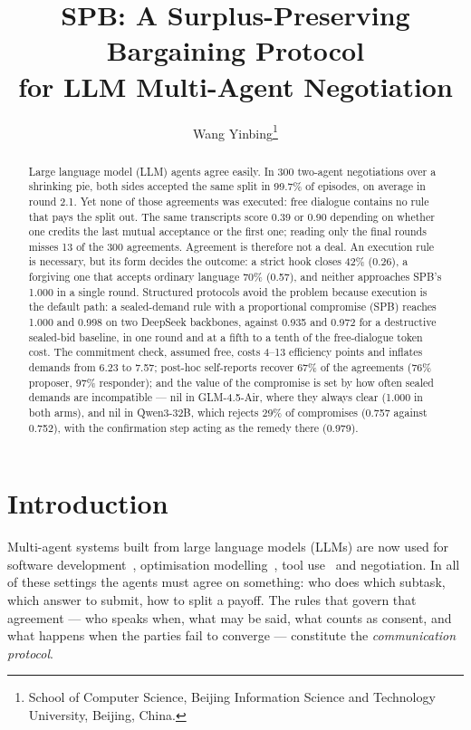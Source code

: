 \documentclass[11pt]{article}
\title{\textbf{SPB: A Surplus-Preserving Bargaining Protocol\\ for LLM Multi-Agent Negotiation}}
\author{Wang Yinbing\thanks{School of Computer Science, Beijing Information Science and Technology University, Beijing, China.}}
\date{}
\begin{document}
\maketitle

\begin{abstract}
\noindent Large language model (LLM) agents agree easily. In 300 two-agent negotiations over a shrinking pie, both sides accepted the same split in 99.7\% of episodes, on average in round 2.1. Yet none of those agreements was executed: free dialogue contains no rule that pays the split out. The same transcripts score 0.39 or 0.90 depending on whether one credits the last mutual acceptance or the first one; reading only the final rounds misses 13 of the 300 agreements. Agreement is therefore not a deal. An execution rule is necessary, but its form decides the outcome: a strict hook closes 42\% (0.26), a forgiving one that accepts ordinary language 70\% (0.57), and neither approaches SPB's 1.000 in a single round. Structured protocols avoid the problem because execution is the default path: a sealed-demand rule with a proportional compromise (SPB) reaches 1.000 and 0.998 on two DeepSeek backbones, against 0.935 and 0.972 for a destructive sealed-bid baseline, in one round and at a fifth to a tenth of the free-dialogue token cost. The commitment check, assumed free, costs 4--13 efficiency points and inflates demands from 6.23 to 7.57; post-hoc self-reports recover 67\% of the agreements (76\% proposer, 97\% responder); and the value of the compromise is set by how often sealed demands are incompatible --- nil in GLM-4.5-Air, where they always clear (1.000 in both arms), and nil in Qwen3-32B, which rejects 29\% of compromises (0.757 against 0.752), with the confirmation step acting as the remedy there (0.979).
\end{abstract}

\section{Introduction}

Multi-agent systems built from large language models (LLMs) are now used for software development~\cite{chatdev,metagpt}, optimisation modelling~\cite{dualtime}, tool use~\cite{autogen} and negotiation. In all of these settings the agents must agree on something: who does which subtask, which answer to submit, how to split a payoff. The rules that govern that agreement --- who speaks when, what may be said, what counts as consent, and what happens when the parties fail to converge --- constitute the \emph{communication protocol}.
\end{document}
